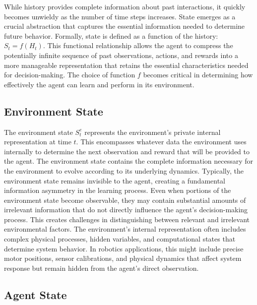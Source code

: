     While history provides complete information about past interactions, it quickly becomes unwieldy as the number of time steps increases. State emerges as a crucial abstraction that captures the essential information needed to determine future behavior. Formally, state is defined as a function of the history:
    $S_t = f(H_t)$.
    This functional relationship allows the agent to compress the potentially infinite sequence of past observations, actions, and rewards into a more manageable representation that retains the essential characteristics needed for decision-making. The choice of function $f$ becomes critical in determining how effectively the agent can learn and perform in its environment.


\subsection{Environment State}

    The environment state $S_t^e$ represents the environment's private internal representation at time $t$. This encompasses whatever data the environment uses internally to determine the next observation and reward that will be provided to the agent. The environment state contains the complete information necessary for the environment to evolve according to its underlying dynamics.
    Typically, the environment state remains invisible to the agent, creating a fundamental information asymmetry in the learning process. Even when portions of the environment state become observable, they may contain substantial amounts of irrelevant information that do not directly influence the agent's decision-making process. This creates challenges in distinguishing between relevant and irrelevant environmental factors.
    The environment's internal representation often includes complex physical processes, hidden variables, and computational states that determine system behavior. In robotics applications, this might include precise motor positions, sensor calibrations, and physical dynamics that affect system response but remain hidden from the agent's direct observation.


\subsection{Agent State}

